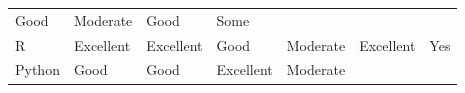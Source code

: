 \documentclass[]{book}
\begin{document}
\begin{longtable}[]{@{}lllllll@{}}
\begin{minipage}[t]{0.16\columnwidth}
Good\strut
\end{minipage} & \begin{minipage}[t]{0.11\columnwidth}\raggedright\strut
Moderate\strut
\end{minipage} & \begin{minipage}[t]{0.17\columnwidth}\raggedright\strut
Good\strut
\end{minipage} & \begin{minipage}[t]{0.05\columnwidth}\raggedright\strut
Some\strut
\end{minipage}\tabularnewline
\begin{minipage}[t]{0.08\columnwidth}\raggedright\strut
R\strut
\end{minipage} & \begin{minipage}[t]{0.11\columnwidth}\raggedright\strut
Excellent\strut
\end{minipage} & \begin{minipage}[t]{0.13\columnwidth}\raggedright\strut
Excellent\strut
\end{minipage} & \begin{minipage}[t]{0.16\columnwidth}\raggedright\strut
Good\strut
\end{minipage} & \begin{minipage}[t]{0.11\columnwidth}\raggedright\strut
Moderate\strut
\end{minipage} & \begin{minipage}[t]{0.17\columnwidth}\raggedright\strut
Excellent\strut
\end{minipage} & \begin{minipage}[t]{0.05\columnwidth}\raggedright\strut
Yes\strut
\end{minipage}\tabularnewline
\begin{minipage}[t]{0.08\columnwidth}\raggedright\strut
Python\strut
\end{minipage} & \begin{minipage}[t]{0.11\columnwidth}\raggedright\strut
Good\strut
\end{minipage} & \begin{minipage}[t]{0.13\columnwidth}\raggedright\strut
Good\strut
\end{minipage} & \begin{minipage}[t]{0.16\columnwidth}\raggedright\strut
Excellent\strut
\end{minipage} & \begin{minipage}[t]{0.11\columnwidth}\raggedright\strut
Moderate\strut
\end{minipage} & \begin{minipage}[t]{0.17\columnwidth}\raggedright\strut

\end{minipage}
\end{longtable}
\end{document}
